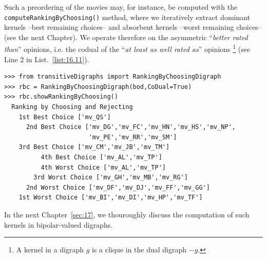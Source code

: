 Such a preordering of the movies may, for instance, be computed with the \texttt{compute\-RankingByChoosing()} method, where we iteratively extract dominant kernels --best remaining choices-- and absorbent kernels --worst remaining choices-- (see the next Chapter). We operate therefore on the asymmetric ``\emph{better rated than}'' opinions, i.e. the codual of the ``\emph{at least as well rated as}'' opinions \footnote{A kernel in a digraph $g$ is a clique in the dual digraph $-g$.} (see Line 2 in List.~\vref{list:16.11}).
\begin{lstlisting}[caption={Bipolar ranking-by-choosing the Grafitti movies},label=list:16.11]
>>> from transitiveDigraphs import RankingByChoosingDigraph
>>> rbc = RankingByChoosingDigraph(bod,CoDual=True)
>>> rbc.showRankingByChoosing()
  Ranking by Choosing and Rejecting
    1st Best Choice ['mv_QS']
      2nd Best Choice ['mv_DG','mv_FC','mv_HN','mv_HS','mv_NP',
                       'mv_PE','mv_RR','mv_SM']
	3rd Best Choice ['mv_CM','mv_JB','mv_TM']
          4th Best Choice ['mv_AL','mv_TP']
          4th Worst Choice ['mv_AL','mv_TP']
        3rd Worst Choice ['mv_GH','mv_MB','mv_RG']
      2nd Worst Choice ['mv_DF','mv_DJ','mv_FF','mv_GG']
    1st Worst Choice ['mv_BI','mv_DI','mv_HP','mv_TF']
\end{lstlisting}

In the next Chapter~\vref{sec:17}, we thouroughly discuss the computation of such kernels in bipolar-valued digraphs.

\clearpage


%